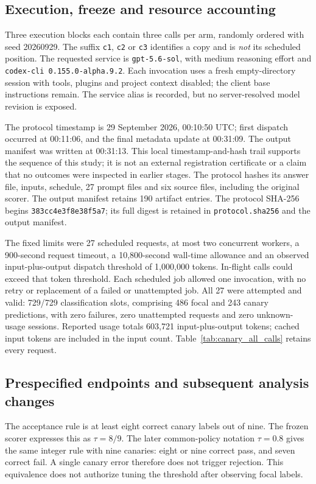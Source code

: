 \subsection{Execution, freeze and resource accounting}
Three execution blocks each contain three calls per arm, randomly ordered with seed 20260929. The suffix \texttt{c1}, \texttt{c2} or \texttt{c3} identifies a copy and is \emph{not} its scheduled position. The requested service is \texttt{gpt-5.6-sol}, with medium reasoning effort and \texttt{codex-cli 0.155.0-alpha.9.2}. Each invocation uses a fresh empty-directory session with tools, plugins and project context disabled; the client base instructions remain. The service alias is recorded, but no server-resolved model revision is exposed.

The protocol timestamp is 29 September 2026, 00:10:50 UTC; first dispatch occurred at 00:11:06, and the final metadata update at 00:31:09. The output manifest was written at 00:31:13. This local timestamp-and-hash trail supports the sequence of this study; it is not an external registration certificate or a claim that no outcomes were inspected in earlier stages. The protocol hashes its answer file, inputs, schedule, 27 prompt files and six source files, including the original scorer. The output manifest retains 190 artifact entries. The protocol SHA-256 begins \texttt{383cc4e3f8e38f5a7}; its full digest is retained in \nolinkurl{protocol.sha256} and the output manifest.

The fixed limits were 27 scheduled requests, at most two concurrent workers, a 900-second request timeout, a 10,800-second wall-time allowance and an observed input-plus-output dispatch threshold of 1,000,000 tokens. In-flight calls could exceed that token threshold. Each scheduled job allowed one invocation, with no retry or replacement of a failed or unattempted job. All 27 were attempted and valid: 729/729 classification slots, comprising 486 focal and 243 canary predictions, with zero failures, zero unattempted requests and zero unknown-usage sessions. Reported usage totals 603,721 input-plus-output tokens; cached input tokens are included in the input count. Table~\ref{tab:canary_all_calls} retains every request.

\subsection{Prespecified endpoints and subsequent analysis changes}
The acceptance rule is at least eight correct canary labels out of nine. The frozen scorer expresses this as $\tau=8/9$. The later common-policy notation $\tau=0.8$ gives the same integer rule with nine canaries: eight or nine correct pass, and seven correct fail. A single canary error therefore does not trigger rejection. This equivalence does not authorize tuning the threshold after observing focal labels.

